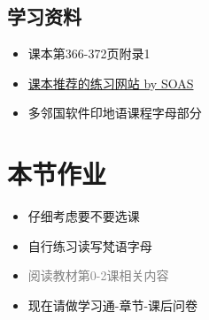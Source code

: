 \documentclass[17pt]{beamer}
\begin{document}
\subsection{学习资料}
\begin{frame}{\insertsubsection }
  \begin{itemize}
    \item
      课本第366-372页附录1
    \item
      \href{https://hindibhasha.com/hindiscripttutor.htm}{课本推荐的练习网站 by SOAS}
    \item
      多邻国软件印地语课程字母部分
  \end{itemize}
\end{frame}  

\section{本节作业}

\begin{frame}{\insertsection }
  \begin{itemize}
    \item
      仔细考虑要不要选课
    \item
      自行练习读写梵语字母
    \item
      \textcolor{gray}{阅读教材第0-2课相关内容}
    \bigskip
    \item
      现在请做学习通\nobreakdash-章节\nobreakdash-课后问卷
  \end{itemize}
\end{frame}  
\end{document}
